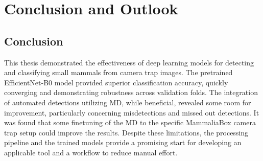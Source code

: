 


\section{Conclusion and Outlook}
\label{conclusion_outlook}

\subsection{Conclusion}

This thesis demonstrated the effectiveness of deep learning models for detecting and classifying small mammals from camera trap images.
The pretrained EfficientNet-B0 model provided superior classification accuracy, quickly converging and demonstrating robustness across validation folds.
The integration of automated detections utilizing \ac{MD}, while beneficial, revealed some room for improvement, particularly concerning misdetections and missed out detections.
It was found that some finetuning of the \ac{MD} to the specific MammaliaBox camera trap setup could improve the results.
Despite these limitations, the processing pipeline and the trained models provide a promising start for developing an applicable tool and a workflow to reduce manual effort.

